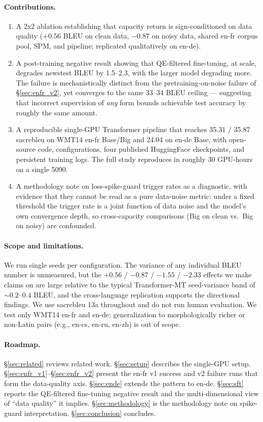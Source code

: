 \paragraph{Contributions.}
\begin{enumerate}
\item A 2x2 ablation establishing that capacity return is sign-conditioned on data quality ($+0.56$ BLEU on clean data, $-0.87$ on noisy data, shared en-fr corpus pool, SPM, and pipeline; replicated qualitatively on en-de).
\item A post-training negative result showing that QE-filtered fine-tuning, at scale, degrades newstest BLEU by 1.5--2.3, with the larger model degrading more. The failure is mechanistically distinct from the pretraining-on-noise failure of \S\ref{sec:enfr_v2}, yet converges to the same 33--34 BLEU ceiling --- suggesting that incorrect supervision of \emph{any} form bounds achievable test accuracy by roughly the same amount.
\item A reproducible single-GPU Transformer pipeline that reaches 35.31 / 35.87 sacrebleu on WMT14 en-fr Base/Big and 24.04 on en-de Base, with open-source code, configurations, four published HuggingFace checkpoints, and persistent training logs. The full study reproduces in roughly 30 GPU-hours on a single 5090.
\item A methodology note on loss-spike-guard trigger rates as a diagnostic, with evidence that they cannot be read as a pure data-noise metric: under a fixed threshold the trigger rate is a joint function of data noise and the model's own convergence depth, so cross-capacity comparisons (Big on clean vs.\ Big on noisy) are confounded.
\end{enumerate}

\paragraph{Scope and limitations.}
We run single seeds per configuration. The variance of any individual BLEU number is unmeasured, but the $+0.56$ / $-0.87$ / $-1.55$ / $-2.33$ effects we make claims on are large relative to the typical Transformer-MT seed-variance band of ${\sim}0.2$--$0.4$ BLEU, and the cross-language replication supports the directional findings. We use sacrebleu 13a throughout and do not run human evaluation. We test only WMT14 en-fr and en-de; generalization to morphologically richer or non-Latin pairs (e.g., en-cs, en-ru, en-zh) is out of scope.

\paragraph{Roadmap.}
\S\ref{sec:related} reviews related work. \S\ref{sec:setup} describes the single-GPU setup. \S\ref{sec:enfr_v1}--\S\ref{sec:enfr_v2} present the en-fr v1 success and v2 failure runs that form the data-quality axis. \S\ref{sec:ende} extends the pattern to en-de. \S\ref{sec:sft} reports the QE-filtered fine-tuning negative result and the multi-dimensional view of ``data quality'' it implies. \S\ref{sec:methodology} is the methodology note on spike-guard interpretation. \S\ref{sec:conclusion} concludes.
